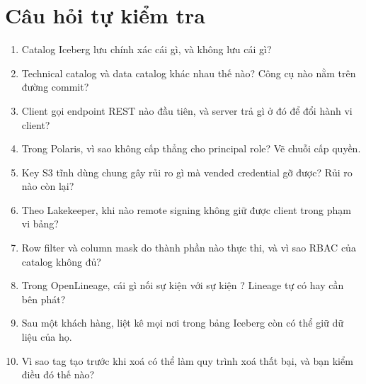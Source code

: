 \section{Câu hỏi tự kiểm tra}
\begin{enumerate}
  \item Catalog Iceberg lưu chính xác cái gì, và không lưu cái gì?
  \item Technical catalog và data catalog khác nhau thế nào? Công cụ nào nằm trên đường commit?
  \item Client gọi endpoint REST nào đầu tiên, và server trả gì ở đó để đổi hành vi client?
  \item Trong Polaris, vì sao không cấp  thẳng cho principal role? Vẽ chuỗi cấp quyền.
  \item Key S3 tĩnh dùng chung gây rủi ro gì mà vended credential gỡ được? Rủi ro nào còn lại?
  \item Theo Lakekeeper, khi nào remote signing không giữ được client trong phạm vi bảng?
  \item Row filter và column mask do thành phần nào thực thi, và vì sao RBAC của catalog không đủ?
  \item Trong OpenLineage, cái gì nối sự kiện  với sự kiện ? Lineage tự có hay cần bên phát?
  \item Sau  một khách hàng, liệt kê mọi nơi trong bảng Iceberg còn có thể giữ dữ liệu của họ.
  \item Vì sao tag tạo trước khi xoá có thể làm quy trình xoá thất bại, và bạn kiểm điều đó thế nào?
\end{enumerate}

